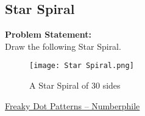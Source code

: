 \documentclass[../../Problems]{subfiles}
\begin{document}
\subsection{Star Spiral}{\label{pp:starspiral}}
\textbf{Problem Statement:}\\
Draw the following Star Spiral.
\begin{figure}[H]
	\centering
	\texttt{[image: Star Spiral.png]}
	\caption{A Star Spiral of 30 sides}
\end{figure}
\begin{funvideo}
\href{https://youtu.be/QAja2jp1VjE}{Freaky Dot Patterns -- Numberphile}
\end{funvideo}
\end{document}
